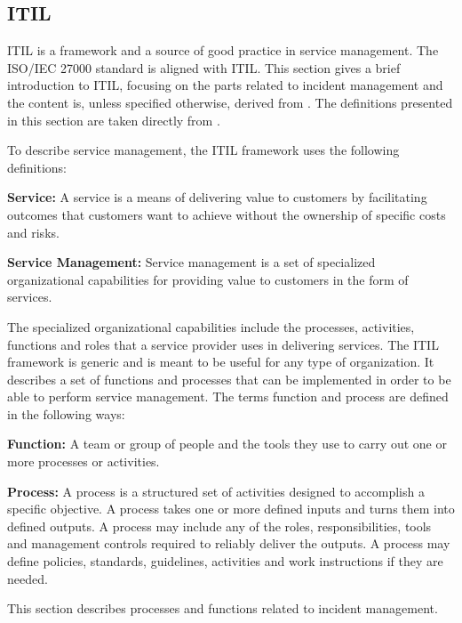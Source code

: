 \subsection{ITIL}
\ac{ITIL} is a framework and a source of good practice in service management. The \acs{ISO}/\acs{IEC} 27000 standard is aligned with \ac{ITIL}. This section gives a brief introduction to \ac{ITIL}, focusing on the parts related to incident management and the content is, unless specified otherwise, derived from \cite{itilbok}. The definitions presented in this section are taken directly from \cite{itilbok}.

To describe service management, the \ac{ITIL} framework uses the following definitions:

\textbf{Service:} A service is a means of delivering value to customers by facilitating outcomes that customers want to achieve without the ownership of specific costs and risks.

\textbf{Service Management:} Service management is a set of specialized organizational capabilities for providing value to customers in the form of services.

The specialized organizational capabilities include the processes, activities, functions and roles that a service provider uses in delivering services. The \ac{ITIL} framework is generic and is meant to be useful for any type of organization. It describes a set of functions and processes that can be implemented in order to be able to perform service management. The terms function and process are defined in the following ways:

\textbf{Function:} A team or group of people and the tools they use to carry out one or more processes or activities.

\textbf{Process:} A process is a structured set of activities designed to accomplish a specific objective. A process takes one or more defined inputs and turns them into defined outputs. A process may include any of the roles, responsibilities, tools and management controls required to reliably deliver the outputs. A process may define policies, standards, guidelines, activities and work instructions if they are needed.


This section describes processes and functions related to incident management.


